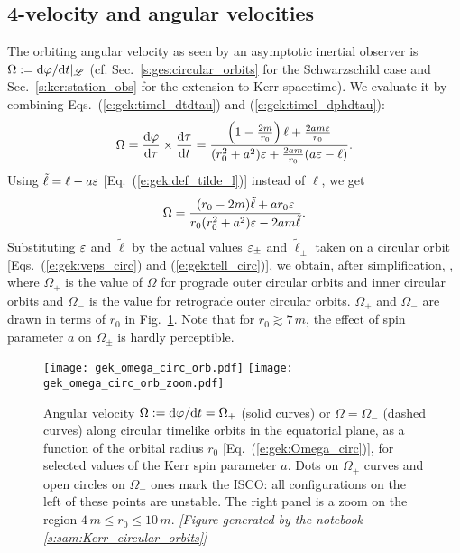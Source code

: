 \subsection{4-velocity and angular velocities} \label{s:gek:circ_velocities}

The orbiting angular velocity as seen by an asymptotic inertial observer is
$\Omega := \mathrm{d}\varphi/\mathrm{d} t |_{\mathscr{L}}$ (cf. Sec.~\ref{s:ges:circular_orbits} for the
Schwarzschild case and Sec.~\ref{s:ker:station_obs} for the extension to Kerr
spacetime).
We evaluate it by combining Eqs.~(\ref{e:gek:timel_dtdtau}) and (\ref{e:gek:timel_dphdtau}):
\[
    \Omega = \frac{\mathrm{d}\varphi}{\mathrm{d}\tau} \times \frac{\mathrm{d}\tau}{\mathrm{d} t}
        = \frac{ \left( 1 - \frac{2m}{r_0} \right) \ell
    + \frac{2 am \varepsilon}{r_0} }{(r_0^2 + a^2) \varepsilon + \frac{2 a m}{r_0} (a\varepsilon - \ell)} .
\]
Using $\tilde{\ell} = \ell - a\varepsilon$ [Eq.~(\ref{e:gek:def_tilde_l})] instead of $\ell$, we
get
\[
    \Omega = \frac{(r_0 - 2m) \tilde{\ell} + a r_0 \varepsilon}{r_0(r_0^2 + a^2) \varepsilon
    - 2 a m \tilde{\ell}} .
\]
Substituting $\varepsilon$ and $\tilde{\ell}$ by the actual values $\varepsilon_\pm$
and $\tilde{\ell}_\pm$ taken on a circular orbit [Eqs.~(\ref{e:gek:veps_circ})
and (\ref{e:gek:tell_circ})], we obtain, after simplification,
\be \label{e:gek:Omega_circ}
     ,
\ee
where $\Omega_+$ is the value of $\Omega$ for prograde outer circular orbits
and inner circular orbits and $\Omega_-$ is the value for retrograde
outer circular orbits. $\Omega_+$ and $\Omega_-$ are drawn in terms of $r_0$
in Fig.~\ref{f:gek:omega_circ_orb}. Note that for $r_0 \gtrsim 7\, m$,
the effect of spin parameter $a$ on $\Omega_\pm$ is hardly perceptible.


\begin{figure}
\begin{center}
\texttt{[image: gek\_omega\_circ\_orb.pdf]}
\texttt{[image: gek\_omega\_circ\_orb\_zoom.pdf]}
\end{center}
\caption[]{\label{f:gek:omega_circ_orb} \footnotesize
Angular velocity $\Omega:=\mathrm{d}\varphi/\mathrm{d} t=\Omega_+$ (solid curves) or $\Omega=\Omega_-$
(dashed curves) along circular timelike
orbits in the equatorial plane, as a function of the orbital radius $r_0$
[Eq.~(\ref{e:gek:Omega_circ})], for selected values of the Kerr spin parameter $a$.
Dots on $\Omega_+$ curves and open circles on $\Omega_-$ ones mark the ISCO: all
configurations on the left of these points are unstable.
The right panel is a zoom on the region $4\,m \leq r_0 \leq 10\,m$.
\textsl{[Figure generated by the notebook \ref{s:sam:Kerr_circular_orbits}]}
}
\end{figure}

